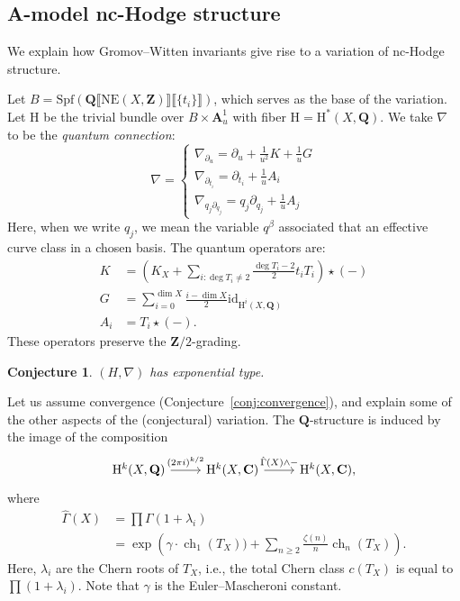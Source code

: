 \documentclass[11pt, reqno]{amsart}
\numberwithin{equation}{section}
\theoremstyle{plain}
\newtheorem{conjecture}[theorem]{Conjecture}
\theoremstyle{definition}
\theoremstyle{italicsname}
\newcommand{\id}{\mathrm{id}}
\DeclareMathOperator{\ch}{{ch}}
\newcommand{\rH}{\mathrm{H}}
\newcommand{\bA}{\mathbf{A}}
\newcommand{\bC}{\mathbf{C}}
\newcommand{\bZ}{\mathbf{Z}}
\newcommand{\bQ}{\mathbf{Q}}
\newcommand{\Spf}{\mathrm{Spf}}
\begin{document}
\subsection*{A-model nc-Hodge structure}
We explain how Gromov--Witten invariants give rise to a variation of nc-Hodge structure.

Let $B = \Spf(\bQ\llbracket \mathrm{NE}(X, \bZ)\rrbracket\llbracket\{t_i\}\rrbracket)$, which serves as the base of the variation.
Let $\rH$ be the trivial bundle over $B \times \bA^1_u$ with fiber $\rH= \rH^*(X, \bQ)$. We take $\nabla$ to be the \emph{quantum connection}:
\begin{equation*}
    \nabla = \begin{cases}
        \nabla_{\partial_u} = \partial_u + \frac{1}{u^2} K + \frac{1}{u} G \\
        \nabla_{\partial_{t_i}} = \partial_{t_i} + \frac{1}{u} A_i \\
        \nabla_{q_j \partial_{q_j}} = q_j \partial_{q_j} + \frac{1}{u} A_j
    \end{cases}
\end{equation*}
Here, when we write $q_j$, we mean the variable $q^\beta$ associated that an effective curve class in a chosen basis. 
The quantum operators are:
\begin{align*}
    K &= \left(K_X + \sum_{i:\deg T_i \neq 2} \frac{\deg T_i - 2}{2} t_i T_i \right) \star (-) \\
    G &= \sum_{i = 0}^{\dim X} \frac{i - \dim X}{2} \id_{\rH^i(X, \bQ)} \\
    A_i &= T_i \star (-).
\end{align*}
These operators preserve the $\bZ/2$-grading.

\begin{conjecture}
    $(H, \nabla)$ has exponential type. 
\end{conjecture}

Let us assume convergence (Conjecture~\ref{conj:convergence}), and explain some of the other aspects of the (conjectural) variation. The $\bQ$-structure is induced by the image of the composition 
\[
    \begin{tikzcd}
        \rH^k(X, \bQ) \ar[r, "(2 \pi i)^{k/2}"] & \rH^k(X, \bC) \ar[r, "\hat \Gamma(X) \wedge -"] & \rH^k(X, \bC),
    \end{tikzcd}
\]
where 
\begin{align*}
    \hat\Gamma(X) &= \prod \Gamma(1 + \lambda_i) \\
        &= \exp\left(\gamma \cdot \ch_1(T_X)) + \sum_{n \geq 2} \frac{\zeta(n)}{n} \ch_n(T_X) \right).
\end{align*}
Here, $\lambda_i$ are the Chern roots of $T_X$, i.e., the total Chern class $c(T_X)$ is equal to $\prod (1 + \lambda_i)$. Note that $\gamma$ is the Euler--Mascheroni constant. 
\end{document}
